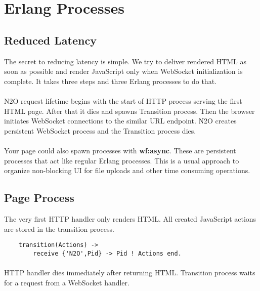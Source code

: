 \section{Erlang Processes}

\subsection{Reduced Latency}
The secret to reducing latency is simple. We try to deliver rendered HTML
as soon as possible and render JavaScript only when WebSocket initialization is complete.
It takes three steps and three Erlang processes to do that.


\paragraph{}
N2O request lifetime begins with the start of HTTP process serving the first HTML page.
After that it dies and spawns Transition process.
Then the browser initiates WebSocket connections to the similar URL endpoint.
N2O creates persistent WebSocket process and the Transition process dies.

\paragraph{}
Your page could also spawn processes with {\bf wf:async}.
These are persistent processes that act like regular Erlang processes.
This is a usual approach to organize non-blocking UI for file uploads and other time consuming operations.

\newpage
\subsection{Page Process}
The very first HTTP handler only renders HTML. All created
JavaScript actions are stored in the transition process.

\begin{lstlisting}
    transition(Actions) ->
        receive {'N2O',Pid} -> Pid ! Actions end.
\end{lstlisting}

\paragraph{}
HTTP handler dies immediately after returning HTML. Transition process
waits for a request from a WebSocket handler.

